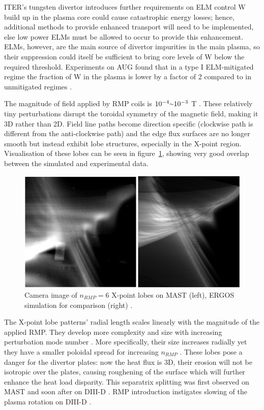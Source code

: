 \documentclass[11pt, twocolumn]{article}  %
\providecommand{\squiggle}{\raise.17ex\hbox{$\scriptstyle\sim$}} %
\begin{document}
ITER's tungsten divertor introduces further requirements on ELM control \cite{KirkFF} W build up in the plasma core could cause catastrophic energy losses; hence, additional methods to provide enhanced transport will need to be implemented, else low power ELMs must be allowed to occur to provide this enhancement. ELMs, however, are the main source of divertor impurities in the main plasma, so their suppression could itself be sufficient to bring core levels of W below the required threshold. Experiments on AUG found that in a type I ELM-mitigated regime the fraction of W in the plasma is lower by a factor of 2 compared to in unmitigated regimes \cite{Suttrop2011}.

The magnitude of field applied by RMP coils is $10^{-4} \squiggle 10^{-3}$ T \cite{Evans2015}. These relatively tiny perturbations disrupt the toroidal symmetry of the magnetic field, making it 3D rather than 2D. Field line paths become direction specific (clockwise path is different from the anti-clockwise path) and the edge flux surfaces are no longer smooth but instead exhibit lobe structures, especially in the X-point region. Visualisation of these lobes can be seen in figure~\ref{fig:lobes}, showing very good overlap between the simulated and experimental data.

\begin{figure}
\includegraphics[scale=0.5]{Figures/lobes.PNG}
\centering
\caption{Camera image of $n_{RMP}=6$ X-point lobes on MAST (left), ERGOS simulation for comparison (right) \cite{Harrison2014}.}\label{fig:lobes}
\end{figure}

The X-point lobe patterns' radial length scales linearly with the magnitude of the applied RMP. They develop more complexity and size with increasing perturbation mode number \cite{Harrison2014}. More specifically, their size increases radially yet they have a smaller poloidal spread for increasing $n_{RMP}$ \cite{Chapman2014}. These lobes pose a danger for the divertor plates: now the heat flux is 3D, their erosion will not be isotropic over the plates, causing roughening of the surface which will further enhance the heat load disparity. This separatrix splitting was first observed on MAST \cite{Kirk2012} and soon after on DIII-D \cite{Shafer2012}. RMP introduction instigates slowing of the plasma rotation on DIII-D \cite{Kirk2013}.
\end{document}

